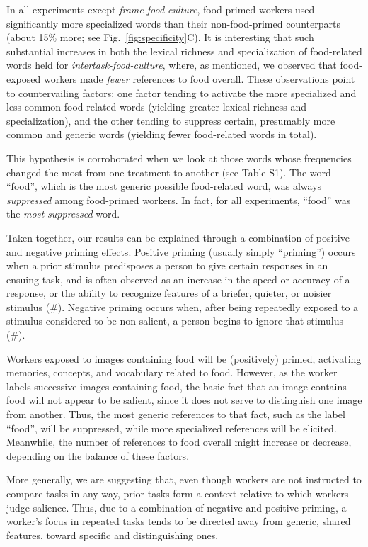 \documentclass[12pt]{article}
\begin{document}
In all experiments except \textit{frame-food-culture}, food-primed workers 
used significantly more specialized words than their non-food-primed 
counterparts (about 15\% more; see Fig.~\ref{fig:specificity}C).
It is interesting that such substantial increases in both the lexical 
richness and specialization of food-related words 
held for \textit{intertask-food-culture}, where, as mentioned, we observed 
that food-exposed workers made \textit{fewer} references to food overall. 
These observations point 
to countervailing factors: one factor tending to activate the more 
specialized and less common food-related words 
(yielding greater lexical richness and specialization), and the other tending 
to suppress certain, presumably more common and generic words 
(yielding fewer food-related words in total).

This hypothesis is corroborated when we look at those words whose 
frequencies changed the most from one treatment to another (see Table S1).  
The word ``food'', which is the most generic possible food-related word, was 
always \textit{suppressed} among food-primed workers.  In fact, 
for all experiments, ``food'' was the \textit{most suppressed} word.

Taken together, our results can be 
explained through a combination of positive and negative priming effects.
Positive priming (usually simply ``priming'') occurs when a prior stimulus 
predisposes a person to give certain responses in an ensuing task, and
is often observed as an increase in the speed or accuracy of a response, or
the ability to recognize features of a briefer, quieter, or noisier stimulus 
(\#).
Negative priming occurs when, after being repeatedly exposed to a stimulus 
considered to be non-salient, a person begins to ignore that 
stimulus (\#).  

Workers exposed to images containing food will be (positively) primed, 
activating memories, concepts, and vocabulary related to food.  
However, as the worker labels successive images containing food, the basic 
fact that an image contains food will not appear to be salient, since it 
does not serve to distinguish one image from another.  Thus, the most 
generic references to that fact, such as the label ``food'', 
will be suppressed, while more specialized references will be elicited.  
Meanwhile, the number of references to food overall might increase or 
decrease, depending on the balance of these factors.  

More generally, we are suggesting that, even though workers are not 
instructed to compare tasks in any way, prior tasks form a 
context relative to which workers judge salience.  Thus, due to a combination 
of negative and positive priming, a worker's focus 
in repeated tasks tends to be directed away from generic, shared features, 
toward specific and distinguishing ones.
\end{document}
